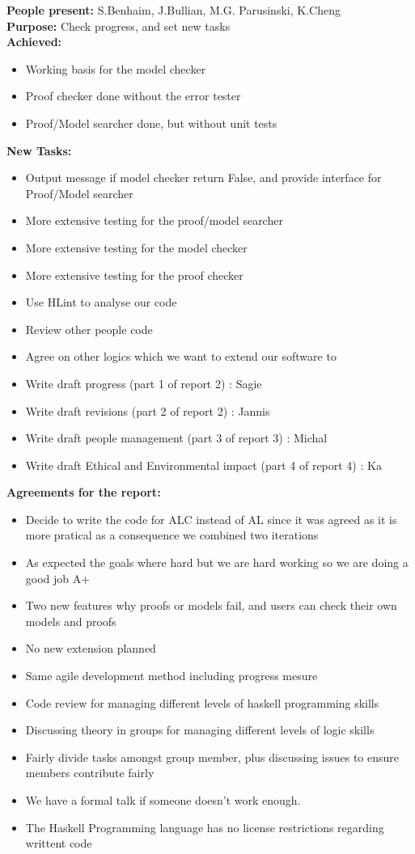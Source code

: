 \documentclass[12pt]{article}
\begin{document}
\textbf{People present:} S.Benhaim, J.Bullian, M.G. Parusinski, K.Cheng \\
\textbf{Purpose:} Check progress, and set new tasks \\
\textbf{Achieved:}
\begin{itemize}
\item Working basis for the model checker
\item Proof checker done without the error tester
\item Proof/Model searcher done, but without unit tests
\end{itemize}
\textbf{New Tasks:}
\begin{itemize}
\item Output message if model checker return False, and provide interface for Proof/Model searcher
\item More extensive testing for the proof/model searcher
\item More extensive testing for the model checker
\item More extensive testing for the proof checker
\item Use HLint to analyse our code
\item Review other people code
\item Agree on other logics which we want to extend our software to
\item Write draft progress (part 1 of report 2) : Sagie
\item Write draft revisions (part 2 of report 2) : Jannis
\item Write draft people management (part 3 of report 3) : Michal
\item Write draft Ethical and Environmental impact (part 4 of report 4) : Ka
\end{itemize}
\textbf{Agreements for the report:}
\begin{itemize}
\item Decide to write the code for ALC instead of AL since it was agreed as it is more pratical as a consequence we combined two iterations
\item As expected the goals where hard but we are hard working so we are doing a good job A+
\item Two new features why proofs or models fail, and users can check their own models and proofs
\item No new extension planned
\item Same agile development method including progress mesure
\item Code review for managing different levels of haskell programming skills
\item Discussing theory in groups for managing different levels of logic skills
\item Fairly divide tasks amongst group member, plus discussing issues to ensure members contribute fairly
\item We have a formal talk if someone doesn't work enough.
\item The Haskell Programming language has no license restrictions regarding writtent code
\end{itemize}
\end{document}
